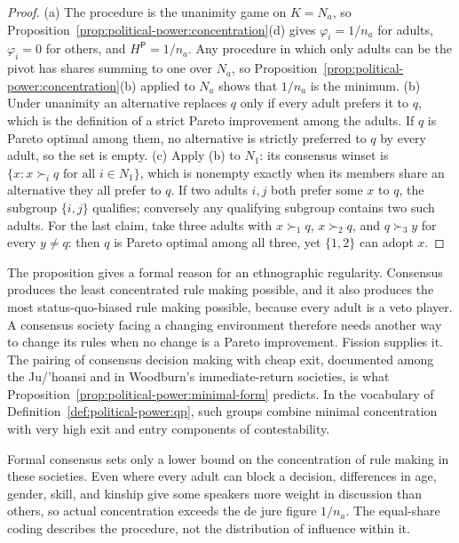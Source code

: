 \documentclass[11pt,letterpaper]{article}
\theoremstyle{definition}
\theoremstyle{remark}
\newcommand{\pP}{\mathsf{P}}
\begin{document}
\begin{proof}
(a) The procedure is the unanimity game on $K=N_a$, so Proposition~\ref{prop:political-power:concentration}(d) gives $\varphi_i=1/n_a$ for adults, $\varphi_i=0$ for others, and $H^{\pP}=1/n_a$. Any procedure in which only adults can be the pivot has shares summing to one over $N_a$, so Proposition~\ref{prop:political-power:concentration}(b) applied to $N_a$ shows that $1/n_a$ is the minimum. (b) Under unanimity an alternative replaces $q$ only if every adult prefers it to $q$, which is the definition of a strict Pareto improvement among the adults. If $q$ is Pareto optimal among them, no alternative is strictly preferred to $q$ by every adult, so the set is empty. (c) Apply (b) to $N_1$: its consensus winset is $\{x: x\succ_i q\text{ for all }i\in N_1\}$, which is nonempty exactly when its members share an alternative they all prefer to $q$. If two adults $i,j$ both prefer some $x$ to $q$, the subgroup $\{i,j\}$ qualifies; conversely any qualifying subgroup contains two such adults. For the last claim, take three adults with $x\succ_1 q$, $x\succ_2 q$, and $q\succ_3 y$ for every $y\neq q$: then $q$ is Pareto optimal among all three, yet $\{1,2\}$ can adopt $x$.
\end{proof}

The proposition gives a formal reason for an ethnographic regularity. Consensus produces the least concentrated rule making possible, and it also produces the most status-quo-biased rule making possible, because every adult is a veto player. A consensus society facing a changing environment therefore needs another way to change its rules when no change is a Pareto improvement. Fission supplies it. The pairing of consensus decision making with cheap exit, documented among the Ju/'hoansi and in Woodburn's immediate-return societies, is what Proposition~\ref{prop:political-power:minimal-form} predicts. In the vocabulary of Definition~\ref{def:political-power:qp}, such groups combine minimal concentration with very high exit and entry components of contestability.

Formal consensus sets only a lower bound on the concentration of rule making in these societies. Even where every adult can block a decision, differences in age, gender, skill, and kinship give some speakers more weight in discussion than others, so actual concentration exceeds the de jure figure $1/n_a$. The equal-share coding describes the procedure, not the distribution of influence within it.
\end{document}
